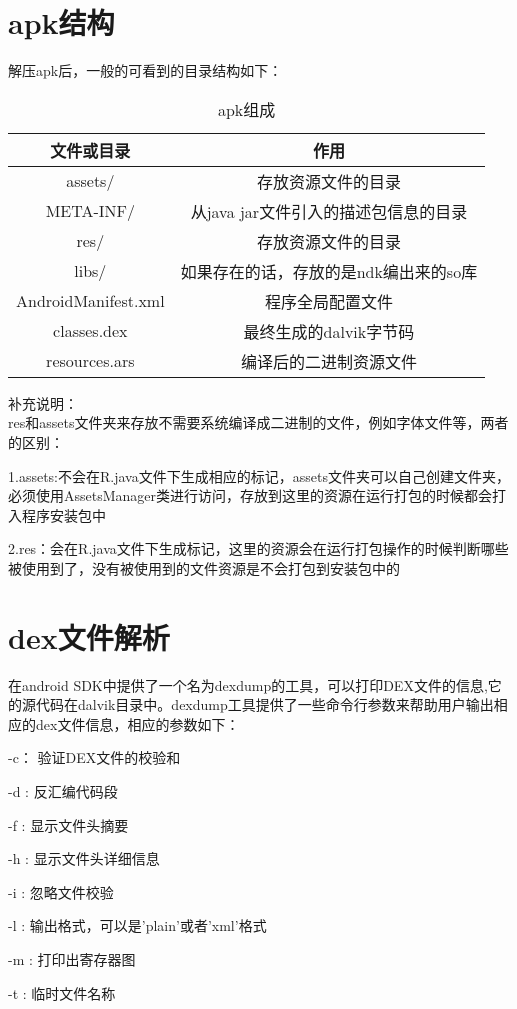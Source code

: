 \section{apk结构}
解压apk后，一般的可看到的目录结构如下：
\begin{table}[htbp]
\centering
\caption{\label{apk}apk组成}
\begin{tabular}{|c|c|}
\hline
文件或目录 & 作用\\
\hline
assets/ & 存放资源文件的目录\\
\hline
META-INF/ & 从java jar文件引入的描述包信息的目录\\
\hline
res/ & 存放资源文件的目录\\
\hline
libs/ & 如果存在的话，存放的是ndk编出来的so库\\
\hline
AndroidManifest.xml & 程序全局配置文件\\
\hline
classes.dex & 最终生成的dalvik字节码\\
\hline
resources.ars & 编译后的二进制资源文件\\
\hline
\end{tabular}
\end{table}

补充说明：\\
res和assets文件夹来存放不需要系统编译成二进制的文件，例如字体文件等，两者的区别：

1.assets:不会在R.java文件下生成相应的标记，assets文件夹可以自己创建文件夹，必须使用AssetsManager类进行访问，存放到这里的资源在运行打包的时候都会打入程序安装包中

2.res：会在R.java文件下生成标记，这里的资源会在运行打包操作的时候判断哪些被使用到了，没有被使用到的文件资源是不会打包到安装包中的
\section{dex文件解析}
在android SDK中提供了一个名为dexdump的工具，可以打印DEX文件的信息,它的源代码在dalvik目录中。dexdump工具提供了一些命令行参数来帮助用户输出相应的dex文件信息，相应的参数如下：

-c： 验证DEX文件的校验和

-d :  反汇编代码段

-f : 显示文件头摘要

-h : 显示文件头详细信息

-i : 忽略文件校验

-l : 输出格式，可以是'plain'或者'xml'格式

-m :  打印出寄存器图

-t : 临时文件名称

